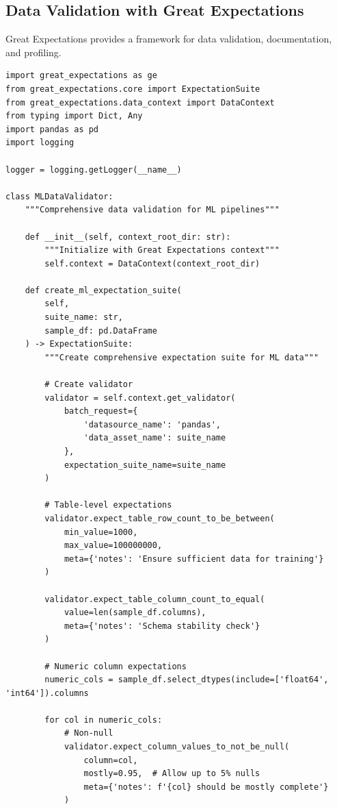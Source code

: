 \subsection{Data Validation with Great Expectations}

Great Expectations provides a framework for data validation, documentation, and profiling.

\begin{lstlisting}[style=python, caption=Comprehensive Data Validation with Great Expectations]
import great_expectations as ge
from great_expectations.core import ExpectationSuite
from great_expectations.data_context import DataContext
from typing import Dict, Any
import pandas as pd
import logging

logger = logging.getLogger(__name__)

class MLDataValidator:
    """Comprehensive data validation for ML pipelines"""

    def __init__(self, context_root_dir: str):
        """Initialize with Great Expectations context"""
        self.context = DataContext(context_root_dir)

    def create_ml_expectation_suite(
        self,
        suite_name: str,
        sample_df: pd.DataFrame
    ) -> ExpectationSuite:
        """Create comprehensive expectation suite for ML data"""

        # Create validator
        validator = self.context.get_validator(
            batch_request={
                'datasource_name': 'pandas',
                'data_asset_name': suite_name
            },
            expectation_suite_name=suite_name
        )

        # Table-level expectations
        validator.expect_table_row_count_to_be_between(
            min_value=1000,
            max_value=100000000,
            meta={'notes': 'Ensure sufficient data for training'}
        )

        validator.expect_table_column_count_to_equal(
            value=len(sample_df.columns),
            meta={'notes': 'Schema stability check'}
        )

        # Numeric column expectations
        numeric_cols = sample_df.select_dtypes(include=['float64', 'int64']).columns

        for col in numeric_cols:
            # Non-null
            validator.expect_column_values_to_not_be_null(
                column=col,
                mostly=0.95,  # Allow up to 5% nulls
                meta={'notes': f'{col} should be mostly complete'}
            )


\end{lstlisting}
